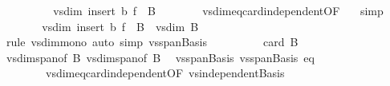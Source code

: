 \begin{isabellebody}
\ \ \ \ \isamarkupfalse%
\ \isamarkupfalse%
\ {\isachardoublequoteopen}{\isasymdots}\ {\isacharequal}{\kern0pt}\ vs{}{\isachardot}{\kern0pt}dim\ {\isacharparenleft}{\kern0pt}insert\ b\ {\isacharparenleft}{\kern0pt}f\ {\isacharbackquote}{\kern0pt}\ B{}{\isacharparenright}{\kern0pt}{\isacharparenright}{\kern0pt}{\isachardoublequoteclose}\isanewline
\ \ \ \ \ \ \isamarkupfalse%
\ vs{}{\isachardot}{\kern0pt}dim{\isacharunderscore}{\kern0pt}eq{\isacharunderscore}{\kern0pt}card{\isacharunderscore}{\kern0pt}independent{\isacharbrackleft}{\kern0pt}OF\ {\isacharasterisk}{\kern0pt}{\isacharasterisk}{\kern0pt}{\isacharbrackright}{\kern0pt}\ \isamarkupfalse%
\ simp\isanewline
\ \ \ \ \isamarkupfalse%
\ \isamarkupfalse%
\ {\isachardoublequoteopen}vs{}{\isachardot}{\kern0pt}dim\ {\isacharparenleft}{\kern0pt}insert\ b\ {\isacharparenleft}{\kern0pt}f\ {\isacharbackquote}{\kern0pt}\ B{}{\isacharparenright}{\kern0pt}{\isacharparenright}{\kern0pt}\ {\isasymle}\ vs{}{\isachardot}{\kern0pt}dim\ B{}{\isachardoublequoteclose}\isanewline
\ \ \ \ \ \ \isamarkupfalse%
\ {\isacharparenleft}{\kern0pt}rule\ vs{}{\isachardot}{\kern0pt}dim{\isacharunderscore}{\kern0pt}mono{\isacharparenright}{\kern0pt}\ {\isacharparenleft}{\kern0pt}auto\ simp{\isacharcolon}{\kern0pt}\ vs{}{\isachardot}{\kern0pt}span{\isacharunderscore}{\kern0pt}Basis{\isacharparenright}{\kern0pt}\isanewline
\ \ \ \ \isamarkupfalse%
\ \isamarkupfalse%
\ {\isachardoublequoteopen}{\isasymdots}\ {\isacharequal}{\kern0pt}\ card\ B{}{\isachardoublequoteclose}\isanewline
\ \ \ \ \ \ \isamarkupfalse%
\ vs{}{\isachardot}{\kern0pt}dim{\isacharunderscore}{\kern0pt}span{\isacharbrackleft}{\kern0pt}of\ B{}{\isacharbrackright}{\kern0pt}\ vs{}{\isachardot}{\kern0pt}dim{\isacharunderscore}{\kern0pt}span{\isacharbrackleft}{\kern0pt}of\ B{}{\isacharbrackright}{\kern0pt}\ \isamarkupfalse%
\ vs{}{\isachardot}{\kern0pt}span{\isacharunderscore}{\kern0pt}Basis\ vs{}{\isachardot}{\kern0pt}span{\isacharunderscore}{\kern0pt}Basis\ eq\ \isanewline
\ \ \ \ \ \ \ \ vs{}{\isachardot}{\kern0pt}dim{\isacharunderscore}{\kern0pt}eq{\isacharunderscore}{\kern0pt}card{\isacharunderscore}{\kern0pt}independent{\isacharbrackleft}{\kern0pt}OF\ vs{}{\isachardot}{\kern0pt}independent{\isacharunderscore}{\kern0pt}Basis{\isacharbrackright}{\kern0pt}\ \isamarkupfalse%

\end{isabellebody}
